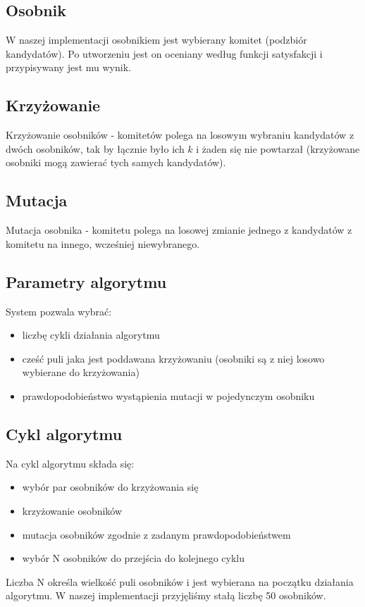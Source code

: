 \documentclass[pdflatex,11pt]{../aghdoc_version2}
\begin{document}
\subsection{Osobnik}
W naszej implementacji osobnikiem jest wybierany komitet (podzbiór kandydatów). 
Po utworzeniu jest on oceniany według funkcji satysfakcji i przypisywany jest mu wynik.

\subsection{Krzyżowanie}
Krzyżowanie osobników - komitetów polega na losowym wybraniu kandydatów z dwóch osobników, tak by łącznie było ich $k$ i żaden się nie powtarzał (krzyżowane osobniki mogą zawierać tych samych kandydatów).

\subsection{Mutacja}
Mutacja osobnika - komitetu polega na losowej zmianie jednego z kandydatów z komitetu na innego, wcześniej niewybranego.

\subsection{Parametry algorytmu}
System pozwala wybrać:
\begin{itemize}
\item liczbę cykli działania algorytmu
\item cześć puli jaka jest poddawana krzyżowaniu (osobniki są z niej losowo wybierane do krzyżowania)
\item prawdopodobieństwo wystąpienia mutacji w pojedynczym osobniku
\end{itemize}

\subsection{Cykl algorytmu}
Na cykl algorytmu składa się:
\begin{itemize}
\item wybór par osobników do krzyżowania się
\item krzyżowanie osobników
\item mutacja osobników zgodnie z zadanym prawdopodobieństwem
\item wybór N osobników do przejścia do kolejnego cyklu
\end{itemize}

Liczba N określa wielkość puli osobników i jest wybierana na początku działania algorytmu. W naszej implementacji przyjęliśmy stałą liczbę 50 osobników.
\end{document}
